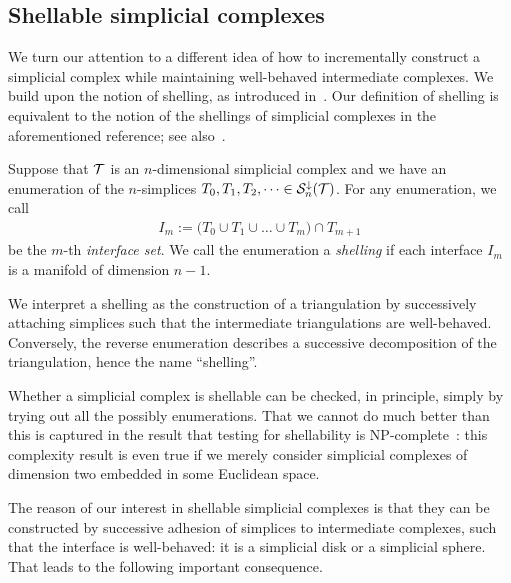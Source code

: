 \documentclass[a4paper]{article}
\begin{document}
\subsection{Shellable simplicial complexes}

We turn our attention to a different idea of how to incrementally construct a simplicial complex while maintaining well-behaved intermediate complexes. 
We build upon the notion of shelling, as introduced in~\cite[Definition 8.1]{ziegler2012lectures}.
Our definition of shelling is equivalent to the notion of the shellings of simplicial complexes in the aforementioned reference; see also~\cite[Remark~8.3]{ziegler2012lectures}. 

Suppose that ${\mathcal T}$ is an $n$-dimensional simplicial complex and we have an enumeration of the $n$-simplices $T_{0}, T_{1}, T_{2}, \dots \in {\mathcal S}^{\downarrow}_{n}({\mathcal T})$.
For any enumeration, we call 
\begin{align*}
    I_m 
    := 
    \big( 
        T_{0} \cup T_{1} \cup \dots \cup T_{m} 
    \big) 
    \cap 
    T_{m+1}
\end{align*}
be the $m$-th \textit{interface set}. 
We call the enumeration a \emph{shelling} if each interface $I_m$ is a manifold of dimension $n-1$. 

\begin{remark}
    We interpret a shelling as the construction of a triangulation 
    by successively attaching simplices such that the intermediate triangulations are well-behaved. 
    Conversely, the reverse enumeration describes a successive decomposition of the triangulation, hence the name ``shelling''.
\end{remark}
\begin{remark}
    Whether a simplicial complex is shellable can be checked, in principle, simply by trying out all the possibly enumerations.
    That we cannot do much better than this is captured in the result that testing for shellability is NP-complete~\cite{goaoc2019shellability}:
    this complexity result is even true if we merely consider simplicial complexes of dimension two embedded in some Euclidean space.
\end{remark}




The reason of our interest in shellable simplicial complexes is that they can be constructed by successive adhesion of simplices to intermediate complexes, 
such that the interface is well-behaved: it is a simplicial disk or a simplicial sphere. 
That leads to the following important consequence.
\end{document}
